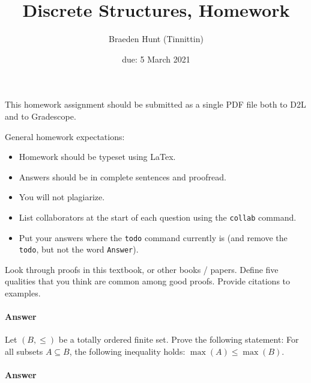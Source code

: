 \documentclass{article}
\title{Discrete Structures, Homework \hwnum}
\author{Braeden Hunt (Tinnittin)}
\date{due: 5 March 2021}
\begin{document}
\maketitle

This homework assignment should be
submitted as a single PDF file both to D2L and to Gradescope.

General homework expectations:
\begin{itemize}
    \item Homework should be typeset using LaTex.
    \item Answers should be in complete sentences and proofread.
    \item You will not plagiarize.
    \item List collaborators at the start of each question using the \texttt{collab} command.
    \item Put your answers where the \texttt{todo} command currently is (and
        remove the \texttt{todo}, but not the word \texttt{Answer}).
\end{itemize}


 

Look through proofs in this textbook, or other books / papers.  Define five
qualities that you think are common among good proofs. Provide citations to
examples.


\paragraph{Answer}




\collab{\todo{}} 

Let $(B,\leq)$ be a totally ordered finite set. Prove the following
statement: For all subsets $A \subseteq B$, the following inequality
holds: $\max(A) \leq \max(B)$.

\paragraph{Answer}
\end{document}
